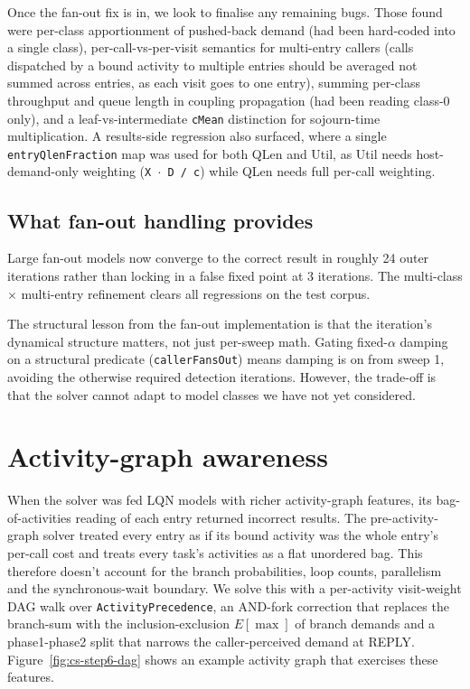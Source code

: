 Once the fan-out fix is in, we look to finalise any remaining bugs. Those found were per-class apportionment of pushed-back demand (had been hard-coded into a single class), per-call-vs-per-visit semantics for multi-entry callers (calls dispatched by a bound activity to multiple entries should be averaged not summed across entries, as each visit goes to one entry), summing per-class throughput and queue length in coupling propagation (had been reading class-0 only), and a leaf-vs-intermediate \texttt{cMean} distinction for sojourn-time multiplication. A results-side regression also surfaced, where a single \texttt{entryQlenFraction} map was used for both QLen and Util, as Util needs host-demand-only weighting (\texttt{X $\cdot$ D / c}) while QLen needs full per-call weighting.

\subsection{What fan-out handling provides}

Large fan-out models now converge to the correct result in roughly 24 outer iterations rather than locking in a false fixed point at 3 iterations. The multi-class $\times$ multi-entry refinement clears all regressions on the test corpus.

The structural lesson from the fan-out implementation is that the iteration's dynamical structure matters, not just per-sweep math. Gating fixed-$\alpha$ damping on a structural predicate (\texttt{callerFansOut}) means damping is on from sweep 1, avoiding the otherwise required detection iterations. However, the trade-off is that the solver cannot adapt to model classes we have not yet considered.





\section{Activity-graph awareness}
\label{sec:contrib-step6}

When the solver was fed LQN models with richer activity-graph features, its bag-of-activities reading of each entry returned incorrect results. The pre-activity-graph solver treated every entry as if its bound activity was the whole entry's per-call cost and treats every task's activities as a flat unordered bag. This therefore doesn't account for the branch probabilities, loop counts, parallelism and the synchronous-wait boundary. We solve this with a per-activity visit-weight DAG walk over \texttt{ActivityPrecedence}, an AND-fork correction that replaces the branch-sum with the inclusion-exclusion $E[\max]$ of branch demands and a phase1-phase2 split that narrows the caller-perceived demand at REPLY. Figure~\ref{fig:cs-step6-dag} shows an example activity graph that exercises these features.

